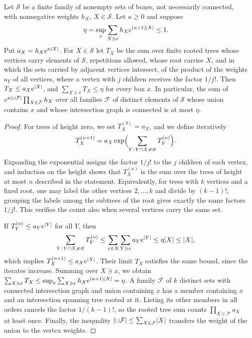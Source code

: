 \begin{lemma}\label{ch09:lem:tree-sum}
Let $\mathcal S$ be a finite family of nonempty sets of boxes, not necessarily connected, with nonnegative weights $h_X$, $X\in\mathcal S$. Let $\kappa\ge0$ and suppose
\[
 \eta=\sup_x\sum_{X\ni x}h_Xe^{(\kappa+1)\lvert X\rvert}\le1.
\]
Put $a_X=h_Xe^{\kappa\lvert X\rvert}$. For $X\in\mathcal S$ let $T_X$ be the sum over finite rooted trees whose vertices carry elements of $\mathcal S$, repetitions allowed, whose root carries $X$, and in which the sets carried by adjacent vertices intersect, of the product of the weights $a_Y$ of all vertices, where a vertex with $j$ children receives the factor $1/j!$. Then $T_X\le a_Xe^{\lvert X\rvert}$, and $\sum_{X\ni x}T_X\le\eta$ for every box $x$. In particular, the sum of $e^{\kappa\lvert \cup\mathcal F\rvert}\prod_{X\in\mathcal F}h_X$ over all families $\mathcal F$ of distinct elements of $\mathcal S$ whose union contains $x$ and whose intersection graph is connected is at most $\eta$.
\end{lemma}

\begin{proof}
For trees of height zero, we set $T_X^{(0)}=a_X$, and we define iteratively
\begin{equation}\label{ch09:eq:tree-recursion}
 T_X^{(n+1)}=a_X\exp\Bigl(\sum_{Y:\,Y\cap X\ne\varnothing}T_Y^{(n)}\Bigr).
\end{equation}
Expanding the exponential assigns the factor $1/j!$ to the $j$ children of each vertex, and induction on the height shows that $T_X^{(n)}$ is the sum over the trees of height at most $n$ described in the statement. Equivalently, for trees with $k$ vertices and a fixed root, one may label the other vertices $2,\ldots,k$ and divide by $(k-1)!$; grouping the labels among the subtrees of the root gives exactly the same factors $1/j!$. This verifies the count also when several vertices carry the same set.

If $T_Y^{(n)}\le a_Ye^{\lvert Y\rvert}$ for all $Y$, then
\[
 \sum_{Y:\,Y\cap X\ne\varnothing}T_Y^{(n)}\le\sum_{x\in X}\sum_{Y\ni x}a_Ye^{\lvert Y\rvert}\le\eta\lvert X\rvert\le\lvert X\rvert,
\]
which implies $T_X^{(n+1)}\le a_Xe^{\lvert X\rvert}$. Their limit $T_X$ satisfies the same bound, since the iterates increase. Summing over $X\ni x$, we obtain $\sum_{X\ni x}T_X\le\sup_x\sum_{X\ni x}h_Xe^{(\kappa+1)\lvert X\rvert}=\eta$. A family $\mathcal F$ of $k$ distinct sets with connected intersection graph and union containing $x$ has a member containing $x$ and an intersection spanning tree rooted at it. Listing its other members in all orders cancels the factor $1/(k-1)!$, so the rooted tree sum counts $\prod_{X\in\mathcal F}a_X$ at least once. Finally, the inequality $\lvert \cup\mathcal F\rvert\le\sum_{X\in\mathcal F}\lvert X\rvert$ transfers the weight of the union to the vertex weights.
\end{proof}

